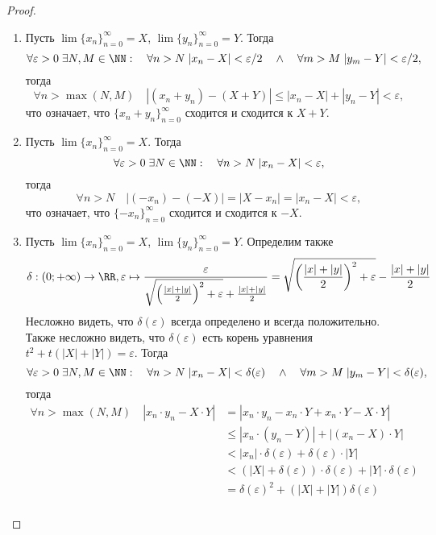 \documentclass[12pt,a4paper]{article}
\begin{document}
    \begin{proof}
        \begin{enumerate}
            \item Пусть $\lim \{x_n\}_{n=0}^\infty = X$, $\lim \{y_n\}_{n=0}^\infty = Y$. Тогда
                \[\forall \varepsilon > 0\; \exists N, M \in \NN:\quad \forall n > N\; |x_n - X| < \varepsilon/2\quad \wedge\quad \forall m > M\; |y_m - Y| < \varepsilon/2,\]
                тогда
                \[\forall n > \max(N, M)\quad |(x_n + y_n) - (X + Y)| \leqslant |x_n - X| + |y_n - Y| < \varepsilon,\]
                что означает, что $\{x_n + y_n\}_{n=0}^\infty$ сходится и сходится к $X + Y$.
            \item Пусть $\lim \{x_n\}_{n=0}^\infty = X$. Тогда
                \[\forall \varepsilon > 0\; \exists N \in \NN:\quad \forall n > N\; |x_n - X| < \varepsilon,\]
                тогда
                \[\forall n > N\quad |(-x_n) - (-X)| = |X - x_n| = |x_n - X| < \varepsilon,\]
                что означает, что $\{-x_n\}_{n=0}^\infty$ сходится и сходится к $-X$.
            \item Пусть $\lim \{x_n\}_{n=0}^\infty = X$, $\lim \{y_n\}_{n=0}^\infty = Y$. Определим также
                \[\delta: (0; +\infty) \to \RR, \varepsilon \mapsto \frac{\varepsilon}{\sqrt{\left(\frac{|x|+|y|}{2}\right)^2+\varepsilon} + \frac{|x|+|y|}{2}} = \sqrt{\left(\frac{|x|+|y|}{2}\right)^2+\varepsilon} - \frac{|x|+|y|}{2}\]
                Несложно видеть, что $\delta(\varepsilon)$ всегда определено и всегда положительно. Также несложно видеть, что $\delta(\varepsilon)$ есть корень уравнения $t^2 + t(|X| + |Y|) = \varepsilon$. Тогда
                \[\forall \varepsilon > 0\; \exists N, M \in \NN:\quad \forall n > N\; |x_n - X| < \delta(\varepsilon)\quad \wedge\quad \forall m > M\; |y_m - Y| < \delta(\varepsilon),\]
                тогда
                \begin{align*}
                    \forall n > \max(N, M)\quad |x_n \cdot y_n - X \cdot Y|
                    &= |x_n \cdot y_n - x_n \cdot Y + x_n \cdot Y - X \cdot Y|\\
                    &\leqslant |x_n \cdot (y_n-Y)| + |(x_n - X) \cdot Y|\\
                    &< |x_n|\cdot \delta(\varepsilon) + \delta(\varepsilon)\cdot |Y|\\
                    &< (|X|+\delta(\varepsilon)) \cdot \delta(\varepsilon) + |Y| \cdot \delta(\varepsilon)\\
                    &= \delta(\varepsilon)^2 + (|X| + |Y|)\delta(\varepsilon)\\

\end{align*}
\end{enumerate}
\end{proof}
\end{document}
